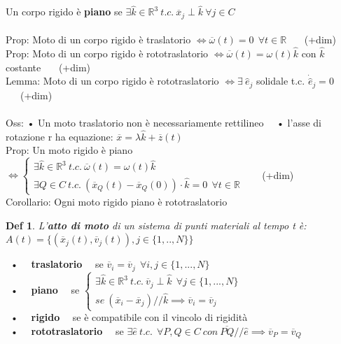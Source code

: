 \documentclass{article}
\theoremstyle{unnumbered}
\newtheorem* {theoremT}{Def}
\theoremstyle{unnumbered1}
\newenvironment{defi}{\begin{gBox}\begin{theoremT}}{\end{theoremT}\end{gBox}}
\begin{document}
%
%
%
Un corpo rigido è \textbf{piano} se $\exists \hat{k} \in \mathbb{R}^3 \ t.c. \ \overline{x}_j \perp \hat{k} \ \forall j \in C$ \\ \\
%
%
%
Prop: Moto di un corpo rigido è traslatorio $\Longleftrightarrow \overline{\omega}(t) =0 \ \ \forall t \in \mathbb{R}$ \ \ \ (+dim) \\
Prop: Moto di un corpo rigido è rototraslatorio $\Longleftrightarrow \overline{\omega}(t) = \omega(t)\hat{k}$ con $\hat{k}$ costante \ \ \ (+dim) \\
Lemma: Moto di un corpo rigido è rototraslatorio $\Longleftrightarrow \exists \ \hat{e}_j$ solidale t.c. $\dot{\hat{e}}_j=0$ \ \ \ (+dim) \\ \\
Oss: • Un moto traslatorio non è necessariamente rettilineo \ \ • l'asse di rotazione r ha equazione: $\overline{x}=\lambda\hat{k} + \overline{z}(t)$ \\
Prop: Un moto rigido è piano $\Longleftrightarrow \begin{cases}
\exists \hat{k} \in \mathbb{R}^3 \ t.c. \ \overline{\omega}(t)= \omega(t)\hat{k} \\
\exists Q \in C \ t.c. \ (\overline{x}_Q(t)-\overline{
x}_Q(0))\cdot \hat{k} = 0 \ \ \forall t \in \mathbb{R} \end{cases}$ \ \ \ (+dim) \\ 
Corollario: Ogni moto rigido piano è rototraslatorio \\
%
%
%
\begin{defi}
L'\textbf{atto di moto} di un sistema di punti materiali al tempo t è: $A(t)=\{ (\overline{x}_j(t),\overline{v}_j(t)), j\in\{1,..,N\} \}$
\end{defi}
\ • \ \ \textbf{traslatorio} \ \ se $\overline{v}_i=\overline{v}_j \ \ \forall i,j \in \{1,...,N\}$ \\
\ • \ \ \textbf{piano} \ \ se $\begin{cases}
\exists \hat{k} \in \mathbb{R}^3 \ t.c. \ \overline{v}_j \perp \hat{k} \ \ \forall j \in \{1,...,N\} \\
se \ (\overline{x}_i -\overline{x}_j) /\!\!/ \hat{k} \implies \overline{v}_i = \overline{v}_j \end{cases}$ \\
\ • \ \ \textbf{rigido} \ \ se è compatibile con il vincolo di rigidità \\
\ • \ \ \textbf{rototraslatorio} \ \ se $ \exists \hat{e} \ t.c. \ \ \forall P,Q \in C \ con \ \overline{PQ} /\!\!/ \hat{e} \implies \overline{v}_P = \overline{v}_Q$ \\
\end{document}
